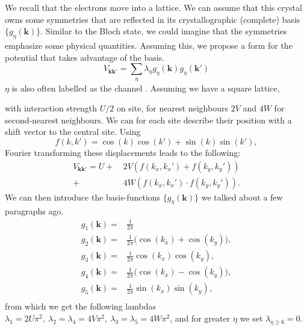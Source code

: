 \documentclass[../main.tex]{subfile}
\begin{document}
We recall that the electrons move into a lattice. We can assume that this crystal owns some symmetries that are reflected in its crystallographic (complete) basis $\{g_{\eta}(\bm{k})\}$.
Similar to the Bloch state, we could imagine that the symmetries emphasize some physical quantities. Assuming this, we propose a form for the potential that takes advantage
of the basis.
\[
    V_{\bm{k}\bm{k}'} = \sum_{\eta} \lambda_{\eta} g_{\eta}(\bm{k})g_{\eta}(\bm{k}')
\]
$\eta$ is also often labelled as the channel \cite{FossheimSudbo2004}. Assuming we have a square lattice, 
\begin{center}
\end{center}
\noindent with interaction strength $U/2$ on site, for nearest neighbours $2V$ and $4W$ for second-nearest neighbours. We can for each site describe their position with a shift vector 
to the central site. Using
\[
    f(k,k')=\cos(k)\cos(k')+\sin(k)\sin(k'),
\]
Fourier transforming these displacements leads to the following:
\[
\begin{aligned}
    V_{\bm{k}\bm{k}'} = U + &~2V\left(f(k_x,k_x')+ f(k_y,k_y')\right)\\
    + &~4W \left(f(k_x,k_x') \cdot f(k_y,k_y')\right).
\end{aligned} 
\]
We can then introduce the basis-functions $\{g_{\eta}(\bm{k})\}$ we talked about a few paragraphs ago.
\begin{align*}
    g_{1}(\bm{k}) =& \frac{1}{2\pi}\\
    g_{2}(\bm{k}) =& \frac{1}{2\pi}\bigl( \cos(k_x) + \cos(k_y)\bigr), \tag{$s$-wave}\\
    g_{3}(\bm{k}) =& \frac{1}{2\pi}\cos(k_x) \cos(k_y),\\
    g_{4}(\bm{k}) =& \frac{1}{2\pi}\bigl( \cos(k_x) - \cos(k_y)\bigr), \tag{$d$-wave}\\
    g_{5}(\bm{k}) =& \frac{1}{2\pi}\sin(k_x) \sin(k_y),\\
\end{align*}
from which we get the following lambdas $\lambda_1 = 2U\pi^2, ~ \lambda_2=\lambda_4 = 4V\pi^2, ~ \lambda_3=\lambda_5=4W \pi^2$, and for greater
$\eta$ we set $\lambda_{\eta\ge6} =0$.
\end{document}

